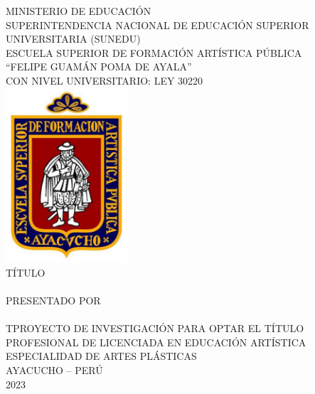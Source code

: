 \documentclass[12pt,a4paper]{article}
\begin{document}
\setlength{\abovecaptionskip}{0pt}
\setlength{\belowcaptionskip}{0pt}

\thispagestyle{empty}

{
	\normalsize\centering\thispagestyle{empty} MINISTERIO DE EDUCACIÓN{}
	\\SUPERINTENDENCIA NACIONAL DE EDUCACIÓN SUPERIOR UNIVERSITARIA (SUNEDU)\\
	\vspace{0.65cm}
{
\large ESCUELA SUPERIOR DE FORMACIÓN ARTÍSTICA PÚBLICA\\``FELIPE GUAMÁN POMA DE AYALA''}\\
{\scriptsize CON NIVEL UNIVERSITARIO: LEY 30220}\\
\vspace{0.65cm}
\includegraphics[height=6.5cm]{logo}\\
\vspace{0.65cm}  {\large TÍTULO}\\
\vspace{0.65cm}
\MakeUppercase{\Large\titulo}\\
\vspace{0.65cm}   
{\large PRESENTADO POR\\
	\vspace{0.65cm}  
	\autor
}\\
\vspace{0.65cm}
\large TPROYECTO DE INVESTIGACIÓN PARA OPTAR EL TÍTULO PROFESIONAL DE LICENCIADA EN EDUCACIÓN ARTÍSTICA\\
\vspace{0.3cm}  ESPECIALIDAD DE ARTES PLÁSTICAS\\
\vspace{0.3cm}  AYACUCHO -- PERÚ\\
\vfill
{ 2023}

}

\newpage{}
\newpage
\end{document}
